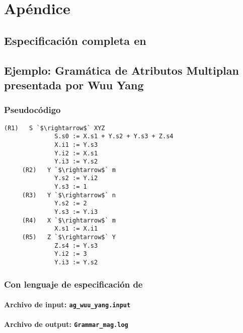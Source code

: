 \chapter{Apéndice}
\label{chap:appendix}

\section{Especificación completa en \spirit}
\label{append:grammarspirit}



\section{Ejemplo: Gramática de Atributos Multiplan presentada por Wuu Yang}
\label{append:agwuuyang}

\subsection{Pseudocódigo}
\begin{lstlisting}[basicstyle=\scriptsize, backgroundcolor=\color{white}]
     (R1)   S `$\rightarrow$` XYZ      
              S.s0 := X.s1 + Y.s2 + Y.s3 + Z.s4
              X.i1 := Y.s3  
              Y.i2 := X.s1
              Y.i3 := Y.s2
     (R2)   Y `$\rightarrow$` m        
              Y.s2 := Y.i2
              Y.s3 := 1
     (R3)   Y `$\rightarrow$` n        
              Y.s2 := 2
              Y.s3 := Y.i3
     (R4)   X `$\rightarrow$` m        
              X.s1 := X.i1
     (R5)   Z `$\rightarrow$` Y        
              Z.s4 := Y.s3
              Y.i2 := 3
              Y.i3 := Y.s2
\end{lstlisting} 

\subsection{Con lenguaje de especificación de \maggen}

\subsubsection{Archivo de input: \texttt{ag\_wuu\_yang.input}}


\subsubsection{Archivo de output: \texttt{Grammar\_mag.log}}



